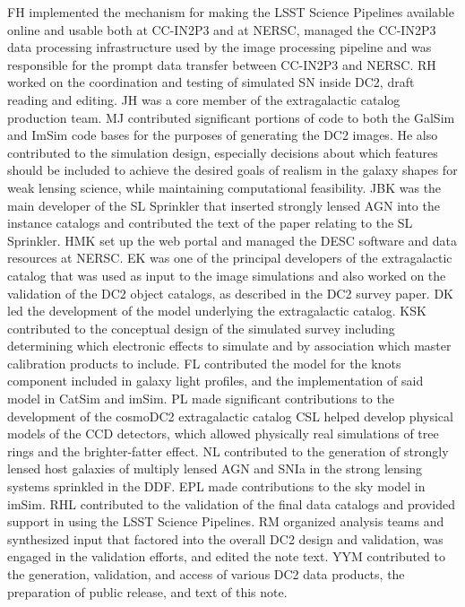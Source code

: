 \documentclass[modern]{descnote}
\begin{document}
%
FH implemented the mechanism for making the LSST Science Pipelines available online and usable both at CC-IN2P3 and at NERSC, managed the CC-IN2P3 data processing infrastructure used by the image processing pipeline and was responsible for the prompt data transfer between CC-IN2P3 and NERSC.
%
RH worked on the coordination and testing of simulated SN inside DC2, draft reading and editing.
%
JH was a core member of the extragalactic catalog production team.
%
MJ contributed significant portions of code to both the GalSim and ImSim code bases for the purposes of generating the DC2 images.  He also contributed to the simulation design, especially decisions about which features should be included to achieve the desired goals of realism in the galaxy shapes for weak lensing science, while maintaining computational feasibility.
%
JBK was the main developer of the SL Sprinkler that inserted strongly lensed AGN into the instance catalogs and contributed the text of the paper relating to the SL Sprinkler.
%
HMK set up the web portal and managed the DESC software and data resources at NERSC. 
%
EK was one of the principal developers of the extragalactic catalog that was used as input to the image simulations and also worked on the validation of the DC2 object catalogs, as described in the DC2 survey paper.
%
DK led the development of the model underlying the extragalactic catalog.
%
KSK contributed to the conceptual design of the simulated survey including determining which electronic effects to simulate and by association which master calibration products to include.
%
FL contributed the model for the knots component included in galaxy light profiles, and the implementation of said model in CatSim and imSim.
%
PL made significant contributions to the development of the cosmoDC2 extragalactic catalog
%
CSL helped develop physical models of the CCD detectors, which allowed physically real simulations of tree rings and the brighter-fatter effect.
%
NL contributed to the generation of strongly lensed host galaxies of multiply lensed AGN and SNIa in the strong lensing systems sprinkled in the DDF.
%
EPL made contributions to the sky model in imSim. 
%
RHL contributed to the validation of the final data catalogs and provided support in using the LSST Science Pipelines.
%
RM organized analysis teams and synthesized input that factored into the overall DC2 design and validation, was engaged in the validation efforts, and edited the note text. 
%
YYM contributed to the generation, validation, and access of various DC2 data products, the preparation of public release, and text of this note.
\end{document}
